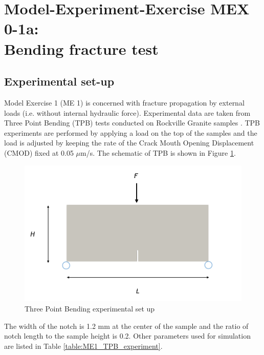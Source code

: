 \section[MEX 0-1a: Bending fracture test (crystalline)]{Model-Experiment-Exercise MEX 0-1a:\\Bending fracture test}
\label{sec:mex01}
\subsection{Experimental set-up}
Model Exercise 1 (ME 1) is concerned with fracture propagation by external loads (i.e. without internal hydraulic force). Experimental data are taken from Three Point Bending (TPB) tests conducted on Rockville Granite samples \cite{Tarokh2016161}. TPB experiments are performed by applying a load on the top of the samples and the load is adjusted by keeping the rate of the Crack Mouth Opening Displacement (CMOD) fixed at 0.05 $\mu$m/s.
The schematic of TPB is shown in Figure \ref{fig:ME1_TPB_experiment}.

\begin{figure}[!ht]
\centering
\includegraphics[width=1\textwidth]{figures/TPB_exp.png}
\caption{Three Point Bending experimental set up}
\label{fig:ME1_TPB_experiment}
\end{figure}

The width of the notch is 1.2 mm at the center of the sample and the ratio of notch length to the sample height is 0.2. 
Other parameters used for simulation are listed in Table \ref{table:ME1_TPB_experiment}.


